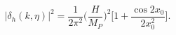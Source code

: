 \begin{equation}
|\delta_{h}(k, \eta)|^2 = \frac{1}{2 \pi^2} \biggl(\frac{H}{M_{P}}\biggr)^2
\biggl[ 1 + \frac{\cos{2 x_0}}{2 x_0^2}\biggr].
\label{finds}
\end{equation}

